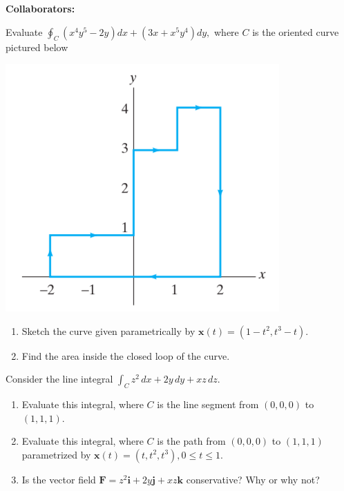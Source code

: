 \documentclass[11pt,letterpaper,boxed]{hmcpset}
\newcommand{\pn}[1]{\left( #1 \right)}
\newcommand{\VEC}[1]{\ensuremath{\mathbf{#1}}\xspace}
\begin{document}
\noindent\textbf{Collaborators:} 


\begin{problem}[Colley 6.2 \#13]
Evaluate $\oint_C \pn{x^4y^5-2y}dx + \pn{3x+x^5y^4}dy,$ where $C$ is the oriented curve pictured below
\begin{center}
\includegraphics[scale=0.5]{fig1.png}
\end{center}
\end{problem}

\begin{solution}
\vfill
\end{solution}
\newpage

\begin{problem}[Colley 6.2 \#15]
\begin{enumerate}
\item Sketch the curve given parametrically by $\VEC{x}(t) = \pn{1-t^2, t^3-t}$.
\item Find the area inside the closed loop of the curve.
\end{enumerate}
\end{problem}

\begin{solution}
\vfill
\end{solution}
\newpage

\begin{problem}[Colley 6.3 \#1]
Consider the line integral $\int_C z^2\,dx+ 2y\,dy+ xz\,dz$.
\begin{enumerate}
\item Evaluate this integral, where $C$ is the line segment from $(0,0,0)$ to $(1,1,1)$.
\item Evaluate this integral, where $C$ is the path from $(0,0,0)$ to $(1,1,1)$ parametrized by $\VEC{x}(t) = (t,t^2,t^3), 0\leq t\leq1$.
\item Is the vector field $\VEC{F} = z^2\VEC{i} + 2y\VEC{j}+xz\VEC{k}$ conservative? Why or why not?
\end{enumerate}
\end{problem}
\end{document}
